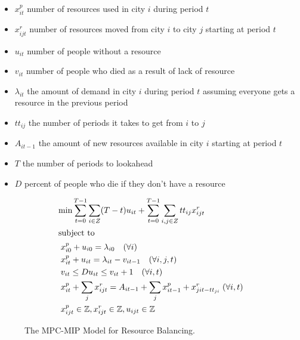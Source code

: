 \documentclass{article}
\begin{document}
\begin{itemize}
	\item $x^p_{it}$ number of resources used in city $i$ during period $t$
	\item $x^r_{ijt}$ number of resources moved from city $i$ to city $j$ starting at period $t$
	\item $u_{it}$ number of people without a resource
	\item $v_{it}$ number of people who died as a result of lack of resource
	\item $\lambda_{it}$ the amount of demand in city $i$ during period $t$ assuming everyone gets a resource in the previous period
	\item $tt_{ij}$ the number of periods it takes to get from $i$ to $j$
	\item $A_{it-1}$ the amount of new resources available in city $i$ starting at period $t$
	\item $T$ the number of periods to lookahead
	\item $D$ percent of people who die if they don't have a resource
\end{itemize}

\begin{figure}[!t]
\begin{subequations} \label{mpc}
\begin{flalign}
& \text{min} \sum_{t=0}^{T-1}\sum_{i \in Z} (T - t)u_{it}  + \sum_{t=0}^{T-1} \sum_{i,j \in Z} tt_{ij} x^r_{ijt} \label{mpc:obj} \\
\intertext{subject to} 
& \; x^p_{i0}  + u_{i0} = \lambda_{i0} \quad (\forall i) \label{mpc:constr:demand_balance_0} \\
& \; x^p_{it}  + u_{it} = \lambda_{it} - v_{it-1} \quad (\forall i,j,t) \label{mpc:constr:demand_balance} \\ 
& \; v_{it} \leq  D u_{it} \leq v_{it} + 1 \quad (\forall i,t) \\
& \; x^p_{it} + \sum_j x^r_{ijt} = A_{it-1} + \sum_{j} x^p_{i t-1} + x^r_{jit - tt_{ji}} \; (\forall i,t)  \label{mpc:constr:balance} \\
& \; x^p_{ijt} \in \mathbb{Z}, x^r_{ijt} \in \mathbb{Z}, u_{ijt} \in \mathbb{Z}  \label{mpc:constr:domain}
\end{flalign}
\end{subequations}
\caption{The MPC-MIP Model for Resource Balancing.}
\label{fig:mpc}
\end{figure}
\end{document}
